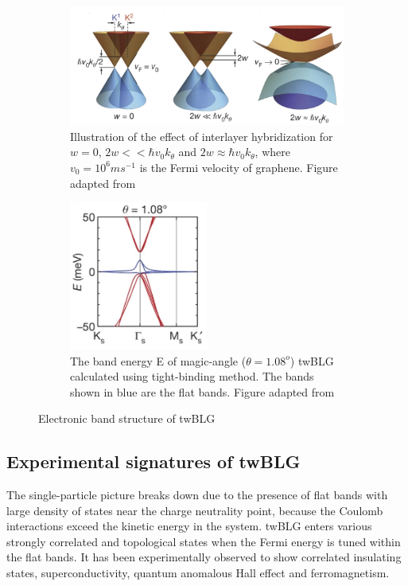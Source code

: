 \begin{figure}[H]
	\centering
	\begin{subfigure}[b]{0.8\textwidth}
		\centering
		\includegraphics[width=\textwidth]{figures/twblg_hyb.jpg}
		\caption{Illustration of the effect of interlayer hybridization for $w=0$, $2w<<\hbar v_0 k_\theta$ and $2w\approx \hbar v_0 k_\theta$, where $v_0=10^6ms^{-1}$ is the Fermi velocity of graphene. Figure adapted from \cite{Cao2018}}
	\end{subfigure}
	
	\begin{subfigure}[b]{0.8\textwidth}
		\centering
		\includegraphics[width=0.5\textwidth]{figures/flatband.jpg}
		\caption{The band energy E of magic-angle ($\theta=1.08^o$) twBLG calculated using tight-binding method. The bands shown in blue are the flat bands. Figure adapted from \cite{Cao2018}}
	\end{subfigure}
	\caption{Electronic band structure of twBLG}
	\label{fig:flat}
\end{figure}

\subsection{Experimental signatures of twBLG}
\label{section:b}
The single-particle picture breaks down due to the presence of flat bands with large density of states near the charge neutrality point, because the Coulomb interactions exceed the kinetic energy in the system. twBLG enters various strongly correlated and topological states when the Fermi energy is tuned within the flat bands. It has been experimentally observed to show correlated insulating states,\cite{Cao2018} superconductivity,\cite{Cao2018_2} quantum anomalous Hall effect \cite{Serlin900,Wu2021}and ferromagnetism. \cite{Sharpe605}

